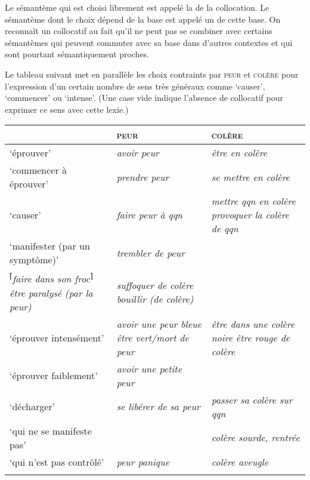 \begin{styleLivreImportant}
Le sémantème qui est choisi librement est appelé la  de la collocation. Le sémantème dont le choix dépend de la base est appelé un  de cette base. On reconnaît un collocatif au fait qu’il ne peut pas se combiner avec certains sémantèmes qui peuvent commuter avec sa base dans d’autres contextes et qui sont pourtant sémantiquement proches.
\end{styleLivreImportant}

Le tableau suivant met en parallèle les choix contraints par \textsc{peur} et \textsc{colère} pour l’expression d’un certain nombre de sens très généraux comme ‘causer’, ‘commencer’ ou ‘intense’. (Une case vide indique l’absence de collocatif pour exprimer ce sens avec cette lexie.)

\begin{tabularx}{\textwidth}{XXX}
\lsptoprule
 & {\scshape peur} & {\scshape colère}\\
 \midrule
‘éprouver’ & {\itshape avoir peur} & {\itshape être en colère}\\
‘commencer à éprouver’ & {\itshape prendre peur} & {\itshape se mettre en colère}\\
‘causer’ & {\itshape faire peur à qqn} & {\itshape mettre qqn en colère} {\itshape provoquer la colère de qqn}\\
‘manifester (par un symptôme)’ & \textit{trembler de peur}\\
\textsuperscript{⌈}\textit{faire dans son froc}\textsuperscript{⌉} {\itshape être paralysé (par la peur)} & {\itshape suffoquer de colère bouillir (de colère)}\\
‘éprouver intensément’ & {\itshape avoir une peur bleue être vert/mort de peur} & {\itshape être dans une colère noire être rouge de colère}\\
‘éprouver faiblement’ & {\itshape avoir une petite peur} & \\
‘décharger’ & {\itshape se libérer de sa peur} & {\itshape passer sa colère sur qqn}\\
‘qui ne se manifeste pas’ &  & {\itshape colère sourde, rentrée}\\
‘qui n’est pas contrôlé’ & {\itshape peur panique} & {\itshape colère aveugle}\\
\lspbottomrule
\end{tabularx}


